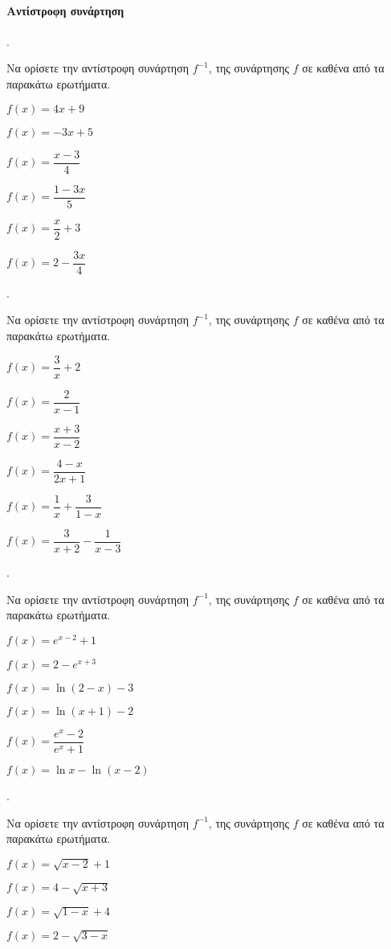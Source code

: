 \documentclass[11pt,a4paper,twocolumn]{article}
\newcounter{askhsh}
\newcommand{\askhsh}{\large\theaskhsh.\ \addtocounter{askhsh}{1}}
\begin{document}
\paragraph{Αντίστροφη συνάρτηση}
\askhsh Να ορίσετε την αντίστροφη συνάρτηση $f^{-1}$, της συνάρτησης $f$ σε καθένα από τα παρακάτω ερωτήματα.
\begin{multicols}{2}
\begin{alist}
\item $f(x)=4x+9$
\item $ f(x)=-3x+5 $
\item $f(x)=\dfrac{x-3}{4}$
\item $f(x)=\dfrac{1-3x}{5}$
\item $f(x)=\dfrac{x}{2}+3$
\item $f(x)=2-\dfrac{3x}{4}$
\end{alist}
\end{multicols}
\askhsh Να ορίσετε την αντίστροφη συνάρτηση $f^{-1}$, της συνάρτησης $f$ σε καθένα από τα παρακάτω ερωτήματα.
\begin{alist}
\begin{multicols}{2}
\item $f(x)=\dfrac{3}{x}+2$
\item $ f(x)=\dfrac{2}{x-1} $
\item $f(x)=\dfrac{x+3}{x-2}$
\item $f(x)=\dfrac{4-x}{2x+1}$
\end{multicols}
\item $f(x)=\dfrac{1}{x}+\dfrac{3}{1-x}$
\item $f(x)=\dfrac{3}{x+2}-\dfrac{1}{x-3}$
\end{alist}
\askhsh Να ορίσετε την αντίστροφη συνάρτηση $f^{-1}$, της συνάρτησης $f$ σε καθένα από τα παρακάτω ερωτήματα.
\begin{alist}
\begin{multicols}{2}
\item $f(x)=e^{x-2}+1$
\item $f(x)=2-e^{x+3}$
\item $f(x)=\ln{(2-x)}-3$
\item $ f(x)=\ln{(x+1)}-2 $
\end{multicols}
\item $f(x)=\dfrac{e^x-2}{e^x+1}$
\item $f(x)=\ln{x}-\ln{(x-2)}$
\end{alist}
\askhsh Να ορίσετε την αντίστροφη συνάρτηση $f^{-1}$, της συνάρτησης $f$ σε καθένα από τα παρακάτω ερωτήματα.
\begin{alist}
\begin{multicols}{2}
\item $f(x)=\sqrt{x-2}+1$
\item $f(x)=4-\sqrt{x+3}$
\item $f(x)=\sqrt{1-x}+4$
\item $ f(x)=2-\sqrt{3-x}$
\end{multicols}
\end{alist}
\end{document}
